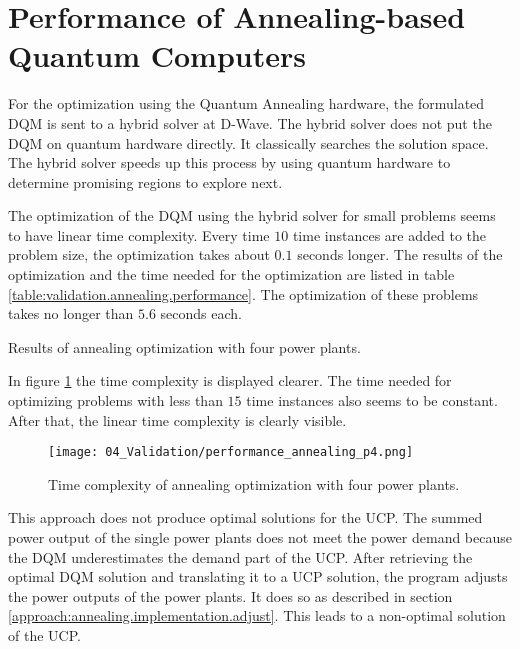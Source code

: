 \section{Performance of Annealing-based Quantum Computers}

For the optimization using the Quantum Annealing hardware, the formulated DQM is sent to a hybrid solver at D-Wave.
The hybrid solver does not put the DQM on quantum hardware directly.
It classically searches the solution space.
The hybrid solver speeds up this process by using quantum hardware to determine promising regions to explore next.
\cite{DQMHybrid2020}

The optimization of the DQM using the hybrid solver for small problems seems to have linear time complexity.
Every time $10$ time instances are added to the problem size, the optimization takes about $0.1$ seconds longer.
The results of the optimization and the time needed for the optimization are listed in table \ref{table:validation.annealing.performance}.
The optimization of these problems takes no longer than $5.6$ seconds each.

\begin{table}[ht]
  \centering
  
  \caption{Results of annealing optimization with four power plants.}
  \label{table:validation.annealing.performance}
\end{table}

In figure \ref{figure:validation.annealing.performance} the time complexity is displayed clearer.
The time needed for optimizing problems with less than $15$ time instances also seems to be constant.
After that, the linear time complexity is clearly visible.

\begin{figure}[ht]
  \centering
  \texttt{[image: 04\_Validation/performance\_annealing\_p4.png]}
  \caption{Time complexity of annealing optimization with four power plants.}
  \label{figure:validation.annealing.performance}
\end{figure}

This approach does not produce optimal solutions for the UCP.
The summed power output of the single power plants does not meet the power demand because the DQM underestimates the demand part of the UCP.
After retrieving the optimal DQM solution and translating it to a UCP solution, the program adjusts the power outputs of the power plants.
It does so as described in section \ref{approach:annealing.implementation.adjust}.
This leads to a non-optimal solution of the UCP.
